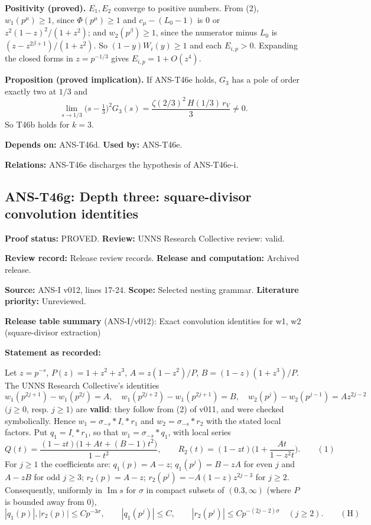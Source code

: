 \documentclass[
  11pt,
]{article}
\begin{document}
\textbf{Positivity (proved).} \(E_1,E_2\) converge to positive numbers.
From (2), \(w_1(p^\mu)\ge1\), since \(\Phi(p^\mu)\ge1\) and
\(c_\mu-(L_0-1)\) is \(0\) or \(z^2(1-z)^2/(1+z^2)\); and
\(w_2(p^\beta)\ge1\), since the numerator minus \(L_0\) is
\((z-z^{2\beta+1})/(1+z^2)\). So \((1-y)W_i(y)\ge1\) and each
\(E_{i,p}>0\). Expanding the closed forms in \(z=p^{-1/3}\) gives
\(E_{i,p}=1+O(z^4)\).

\textbf{Proposition (proved implication).} If ANS-T46e holds, \(G_3\)
has a pole of order exactly two at \(1/3\) and
\[\lim_{s\to1/3}\big(s-\tfrac13\big)^2G_3(s)=\frac{\zeta(2/3)^2\,H(1/3)\,r_V}3\ne0.\]
So T46b holds for \(k=3\).

\textbf{Depends on:} ANS-T46d. \textbf{Used by:} ANS-T46e.

\textbf{Relations:} ANS-T46e discharges the hypothesis of ANS-T46e-i.

\hypertarget{ans-t46g-depth-three-square-divisor-convolution-identities}{%
\subsection{ANS-T46g: Depth three: square-divisor convolution
identities}\label{ans-t46g-depth-three-square-divisor-convolution-identities}}

\textbf{Proof status:} PROVED. \textbf{Review:} UNNS Research Collective
review: valid.

\textbf{Review record:} Release review records. \textbf{Release and
computation:} Archived release.

\textbf{Source:} ANS-I v012, lines 17-24. \textbf{Scope:} Selected
nesting grammar. \textbf{Literature priority:} Unreviewed.

\textbf{Release table summary} (ANS-I/v012): Exact convolution
identities for w1, w2 (square-divisor extraction)

\textbf{Statement as recorded:}

Let \(z=p^{-s}\), \(P(z)=1+z^2+z^3\), \(A=z(1-z^2)/P\),
\(B=(1-z)(1+z^3)/P\). The UNNS Research Collective's identities
\[w_1(p^{2j+1})-w_1(p^{2j})=A,\quad w_1(p^{2j+2})-w_1(p^{2j+1})=B,\quad w_2(p^j)-w_2(p^{j-1})=Az^{2j-2}\]
\((j\ge0\), resp. \(j\ge1)\) are \textbf{valid}: they follow from (2) of
v011, and were checked symbolically. Hence
\(w_1=\sigma_{-s}*I_\square*r_{1}\) and \(w_2=\sigma_{-s}*r_2\) with the
stated local factors. Put \(q_1=I_\square*r_1\), so that
\(w_1=\sigma_{-s}*q_1\), with local series
\[Q(t)=\frac{(1-zt)\big(1+At+(B-1)t^2\big)}{1-t^2},\qquad R_2(t)=(1-zt)\Big(1+\frac{At}{1-z^2t}\Big).\qquad(1)\]
For \(j\ge1\) the coefficients are: \(q_1(p)=A-z\); \(q_1(p^j)=B-zA\)
for even \(j\) and \(A-zB\) for odd \(j\ge3\); \(r_2(p)=A-z\);
\(r_2(p^j)=-A(1-z)z^{2j-3}\) for \(j\ge2\). Consequently, uniformly in
\(\operatorname{Im}s\) for \(\sigma\) in compact subsets of
\((0.3,\infty)\) (where \(P\) is bounded away from \(0\)),
\[|q_1(p)|,|r_2(p)|\le Cp^{-3\sigma},\qquad|q_1(p^j)|\le C,\qquad|r_2(p^j)|\le Cp^{-(2j-2)\sigma}\quad(j\ge2).\qquad(\mathrm H)\]
\end{document}
